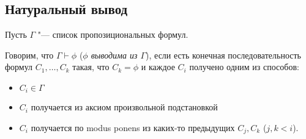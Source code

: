 \subsection{Натуральный вывод}
Пусть $\Gamma$ "--- список пропозициональных формул.
\begin{Def}
	Говорим, что $\Gamma \vdash \phi$ (\textsl{$\phi$ выводима из $\Gamma$}), если
	есть конечная последовательность формул $C_1, \dots, C_k$ такая, что $C_k=\phi$ и каждое $C_i$ получено одним из способов:
	\begin{itemize}
		\item $C_i \in \Gamma$
		\item $C_i$ получается из аксиом произвольной подстановкой
		\item $C_i$ получается по modus ponens из каких-то предыдущих $C_j, C_k$ ($j, k < i$).
	\end{itemize}
\end{Def}

